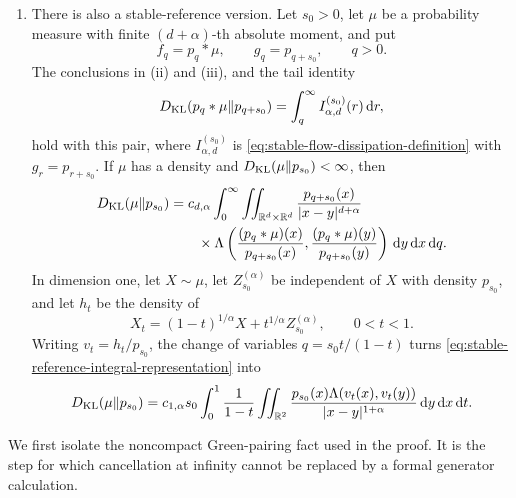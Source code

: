 \begin{theorem}
\begin{enumerate}[label=\textup{(\roman*)}]
\item There is also a stable-reference version.  Let \(s_0>0\), let
\(\mu\) be a probability measure with finite \((d+\alpha)\)-th absolute
moment, and put
\[
 f_q=p_q*\mu,\qquad g_q=p_{q+s_0},\qquad q>0.
\]
The conclusions in \textup{(ii)} and \textup{(iii)}, and the tail identity
\begin{equation}\label{eq:stable-reference-tail-integral}
 D_{\rm KL}(p_q*\mu\|p_{q+s_0})
 =\int_q^\infty I_{\alpha,d}^{(s_0)}(r)\,\mathrm{d} r,
\end{equation}
hold with this pair, where \(I_{\alpha,d}^{(s_0)}\) is
\eqref{eq:stable-flow-dissipation-definition} with \(g_r=p_{r+s_0}\).
If \(\mu\) has a density and
\(D_{\rm KL}(\mu\|p_{s_0})<\infty\), then
\begin{align}
 D_{\rm KL}(\mu\|p_{s_0})
 &=c_{d,\alpha}\int_0^\infty
 \iint_{\mathbb{R}^d\times\mathbb{R}^d}
 \frac{p_{q+s_0}(x)}{|x-y|^{d+\alpha}}\notag\\
 &\qquad\times
 \Lambda\left(
 \frac{(p_q*\mu)(x)}{p_{q+s_0}(x)},
 \frac{(p_q*\mu)(y)}{p_{q+s_0}(y)}
 \right)\,\mathrm{d} y\,\mathrm{d} x\,\mathrm{d} q.\label{eq:stable-reference-integral-representation}
\end{align}
In dimension one, let \(X\sim\mu\), let \(Z_{s_0}^{(\alpha)}\) be
independent of \(X\) with density \(p_{s_0}\), and let \(h_t\) be the density
of
\begin{equation}\label{eq:johnson-stable-interpolation}
 X_t=(1-t)^{1/\alpha}X+t^{1/\alpha}Z_{s_0}^{(\alpha)},
 \qquad 0<t<1.
\end{equation}
Writing \(v_t=h_t/p_{s_0}\), the change of variables
\(q=s_0t/(1-t)\) turns
\eqref{eq:stable-reference-integral-representation} into
\begin{equation}\label{eq:johnson-stable-interpolation-representation}
 D_{\rm KL}(\mu\|p_{s_0})
 =c_{1,\alpha}s_0\int_0^1\frac1{1-t}
 \iint_{\mathbb{R}^2}
 \frac{p_{s_0}(x)\Lambda(v_t(x),v_t(y))}
 {|x-y|^{1+\alpha}}\,\mathrm{d} y\,\mathrm{d} x\,\mathrm{d} t.
\end{equation}
\end{enumerate}
\end{theorem}

We first isolate the noncompact Green-pairing fact used in the proof.  It is
the step for which cancellation at infinity cannot be replaced by a formal
generator calculation.

